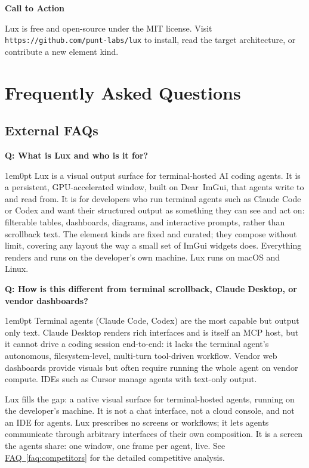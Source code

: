 \documentclass[11pt,letterpaper]{article}
\newcommand{\prsection}[1]{%
  \vspace{1em}%
  {\large\bfseries\color{SectionBlue}#1}%
  \vspace{0.3em}\par%
}
\newcounter{faqnum}
\newenvironment{faqpair}[1]{%
  \needspace{4\baselineskip}%
  \vspace{0.5em}%
  \refstepcounter{faqnum}%
  \noindent\textbf{\color{SectionBlue}Q\thefaqnum: #1}\par\nopagebreak[4]%
  \vspace{0.2em}%
  \begin{adjustwidth}{1em}{0pt}%
  \setlength{\parindent}{0pt}%
}{%
  \end{adjustwidth}%
  \vspace{0.5em}%
}
\newcommand{\faqref}[1]{\hyperref[#1]{FAQ~\ref*{#1}}}
\begin{document}
\prsection{Call to Action}

Lux is free and open-source under the MIT license. Visit
{\small\texttt{https://github.com/punt-labs/lux}} to install, read the target
architecture, or contribute a new element kind.

\newpage


\section*{Frequently Asked Questions}


\subsection*{External FAQs}

\begin{faqpair}{What is Lux and who is it for?}\label{faq:what}
  Lux is a visual output surface for terminal-hosted AI coding agents. It is a
  persistent, GPU-accelerated window, built on Dear~ImGui\cite{imgui2025},
  that agents write to and read from. It is for developers who run terminal
  agents such as Claude Code\cite{anthropic2025claudecode} or
  Codex\cite{openai2025codex} and want their structured output as something they
  can see and act on: filterable tables, dashboards, diagrams, and interactive
  prompts, rather than scrollback text. The element kinds are fixed and
  curated; they compose without limit, covering any layout the way a small
  set of ImGui widgets does. Everything renders and runs on the developer's
  own machine. Lux runs on macOS and Linux.
\end{faqpair}

\begin{faqpair}{How is this different from terminal scrollback, Claude Desktop, or vendor dashboards?}\label{faq:competition}
  Terminal agents (Claude Code, Codex) are the most capable but output only
  text. Claude Desktop renders rich interfaces and is itself an MCP host, but it
  cannot drive a coding session end-to-end: it lacks the terminal agent's
  autonomous, filesystem-level, multi-turn tool-driven workflow. Vendor web
  dashboards provide visuals but often require running the whole agent on
  vendor compute. IDEs such as Cursor manage agents with text-only output.

  Lux fills the gap: a native visual surface for terminal-hosted agents, running
  on the developer's machine. It is not a chat interface, not a cloud console,
  and not an IDE for agents. Lux prescribes no screens or workflows; it lets
  agents communicate through arbitrary interfaces of their own composition. It is
  a screen the agents share: one window, one frame per agent, live. See
  \faqref{faq:competitors} for the detailed competitive analysis.
\end{faqpair}
\end{document}
